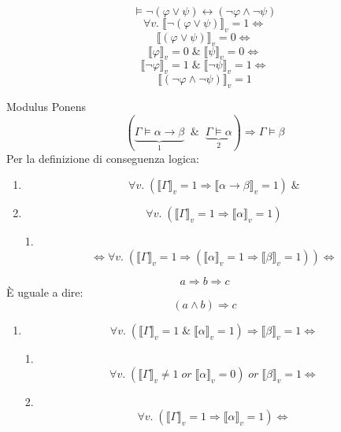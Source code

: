 \documentclass{article}
\theoremstyle{break}
\theoremstyle{break}
\theoremstyle{break}
\theoremstyle{break}
\begin{document}
\begin{figure}[H]
  \begin{exercise}
    \[
      \models \neg (\varphi \vee \psi) \leftrightarrow (\neg \varphi \wedge \neg \psi)
    \] 
    \[
      \forall v.\; \llbracket \neg (\varphi \vee \psi)\rrbracket_v=1 \Leftrightarrow
    \] 
    \[
      \llbracket (\varphi \vee \psi)\rrbracket_v=0 \Leftrightarrow
    \] 
    \[
      \llbracket \varphi\rrbracket_v=0\; \&\; \llbracket \psi\rrbracket_v=0 \Leftrightarrow
    \] 
    \[
      \llbracket \neg \varphi\rrbracket_v=1 \; \&\; \llbracket \neg \psi\rrbracket_v=1 \Leftrightarrow
    \] 
    \[
      \llbracket (\neg \varphi \wedge \neg \psi)\rrbracket_v=1
    \] 
  \end{exercise}
\end{figure}
\begin{exercise}
  Modulus Ponens
  \[
    (\underbrace{\Gamma \models \alpha \to \beta}_{1}\;\;\&\;\; \underbrace{\Gamma \models \alpha}_{2}) \Rightarrow \Gamma \models \beta
  \] 
  Per la definizione di conseguenza logica:
  \begin{enumerate}
    \item \[
        \forall v.\; (\llbracket \Gamma\rrbracket_v=1 \Rightarrow \llbracket \alpha \to \beta\rrbracket_v=1) \;\&
      \] 
    \item \[
        \forall v.\; (\llbracket \Gamma\rrbracket_v=1 \Rightarrow \llbracket \alpha\rrbracket_v=1)
      \] 
    \item[1.] \[
        \Leftrightarrow \forall v.\; (\llbracket \Gamma\rrbracket_v=1 \Rightarrow (\llbracket \alpha\rrbracket_v=1 \Rightarrow \llbracket \beta\rrbracket_v=1)) \Leftrightarrow
      \] 
  \end{enumerate}
  \begin{define}
    \[
      a \Rightarrow b \Rightarrow c
    \] 
    È uguale a dire:
    \[
      (a \wedge b) \Rightarrow c
    \] 
  \end{define}
  \begin{enumerate}
    \item 
      \[
        \forall v.\; (\llbracket \Gamma\rrbracket_v=1\;\&\;\llbracket \alpha\rrbracket_v=1) \Rightarrow \llbracket \beta\rrbracket_v=1 \Leftrightarrow
      \] 
    \item[1.]\[
        \forall v.\; (\llbracket \Gamma\rrbracket_v \neq 1\; or\; \llbracket \alpha\rrbracket_v=0)\; or\; \llbracket \beta\rrbracket_v=1 \Leftrightarrow
      \] 
    \item[2.]\[
        \forall v.\; (\llbracket \Gamma\rrbracket_v=1 \Rightarrow \llbracket \alpha\rrbracket_v = 1) \Leftrightarrow
\]
\end{enumerate}
\end{exercise}
\end{document}
